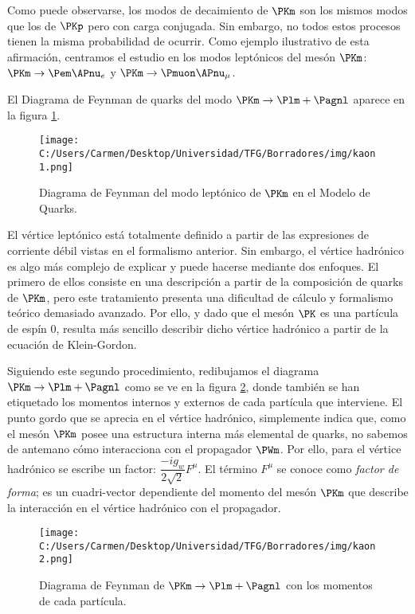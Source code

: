 Como puede observarse, los modos de decaimiento de $\PKm$ son los mismos modos que los de $\PKp$ pero con carga conjugada. Sin embargo, no todos estos procesos tienen la misma probabilidad de ocurrir. Como ejemplo ilustrativo de esta afirmación, centramos el estudio en los modos leptónicos del mesón $\PKm$: $\PKm \rightarrow \Pem \APnu_{e}$ y $\PKm \rightarrow \Pmuon \APnu_{\mu}$.

El Diagrama de Feynman de quarks del modo $\PKm \rightarrow \Plm + \Pagnl$ aparece en la figura \ref{fig:diagrama1}.

\begin{figure}[ht!]
	\centering
	\texttt{[image: C:/Users/Carmen/Desktop/Universidad/TFG/Borradores/img/kaon1.png]}
	\caption[Diagrama de Feynman de quarks de $\PKm \rightarrow \Plm + \Pagnl$]
	{Diagrama de Feynman del modo leptónico de $\PKm$ en el Modelo de Quarks.}
	\label{fig:diagrama1}
\end{figure}

El vértice leptónico está totalmente definido a partir de las expresiones de corriente débil vistas en el formalismo anterior. Sin embargo, el vértice hadrónico es algo más complejo de explicar y puede hacerse mediante dos enfoques. El primero de ellos consiste en una descripción a partir de la composición de quarks de $\PKm$, pero este tratamiento presenta una dificultad de cálculo y formalismo teórico demasiado avanzado. Por ello, y dado que el mesón $\PK$ es una partícula de espín 0, resulta más sencillo describir dicho vértice hadrónico a partir de la ecuación de Klein-Gordon.

Siguiendo este segundo procedimiento, redibujamos el diagrama $\PKm \rightarrow \Plm + \Pagnl$ como se ve en la figura \ref{fig:diagrama2}, donde también se han etiquetado los momentos internos y externos de cada partícula que interviene. El punto gordo que se aprecia en el vértice hadrónico, simplemente indica que, como el mesón $\PKm$ posee una estructura interna más elemental de quarks, no sabemos de antemano cómo  interacciona con el propagador $\PWm$. Por ello, para el vértice hadrónico se escribe un factor: $\dfrac{-ig_{w}}{2\sqrt{2}}F^{\mu}$. El término $F^{\mu}$ se conoce como \textit{factor de forma}; es un cuadri-vector dependiente del momento del mesón $\PKm$ que describe la interacción en el vértice hadrónico con el propagador.

\begin{figure}[ht!]
	\centering
	\texttt{[image: C:/Users/Carmen/Desktop/Universidad/TFG/Borradores/img/kaon2.png]}
	\caption[Diagrama de Feynman de $\PKm \rightarrow \Plm + \Pagnl$ con los momentos]
	{Diagrama de Feynman de $\PKm \rightarrow \Plm + \Pagnl$ con los momentos de cada partícula.}
	\label{fig:diagrama2}
\end{figure}

